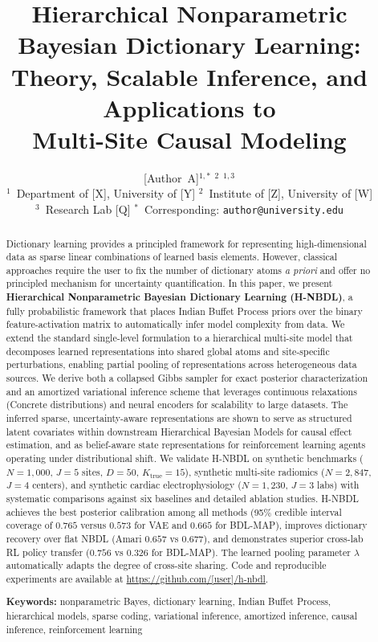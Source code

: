 \documentclass[11pt,a4paper]{article}
\title{\textbf{Hierarchical Nonparametric Bayesian Dictionary Learning:}\\[4pt]
Theory, Scalable Inference, and Applications to\\Multi-Site Causal Modeling}
\author{
  {[Author~A]}$^{1,*}$ \quad {[Author~B]}$^{2}$ \quad {[Author~C]}$^{1,3}$\\[6pt]
  \small $^1$~Department of [X], University of [Y] \quad
  $^2$~Institute of [Z], University of [W]\\
  \small $^3$~Research Lab [Q] \quad
  $^*$~Corresponding: \texttt{author@university.edu}
}
\date{}
\theoremstyle{definition}
\begin{document}
\maketitle

\begin{abstract}
Dictionary learning provides a principled framework for representing high-dimensional data as sparse linear combinations of learned basis elements. However, classical approaches require the user to fix the number of dictionary atoms \emph{a priori} and offer no principled mechanism for uncertainty quantification. In this paper, we present \textbf{Hierarchical Nonparametric Bayesian Dictionary Learning (H-NBDL)}, a fully probabilistic framework that places Indian Buffet Process priors over the binary feature-activation matrix to automatically infer model complexity from data. We extend the standard single-level formulation to a hierarchical multi-site model that decomposes learned representations into shared global atoms and site-specific perturbations, enabling partial pooling of representations across heterogeneous data sources. We derive both a collapsed Gibbs sampler for exact posterior characterization and an amortized variational inference scheme that leverages continuous relaxations (Concrete distributions) and neural encoders for scalability to large datasets. The inferred sparse, uncertainty-aware representations are shown to serve as structured latent covariates within downstream Hierarchical Bayesian Models for causal effect estimation, and as belief-aware state representations for reinforcement learning agents operating under distributional shift. We validate H-NBDL on synthetic benchmarks ($N{=}1{,}000$, $J{=}5$ sites, $D{=}50$, $K_{\mathrm{true}}{=}15$), synthetic multi-site radiomics ($N{=}2{,}847$, $J{=}4$ centers), and synthetic cardiac electrophysiology ($N{=}1{,}230$, $J{=}3$ labs) with systematic comparisons against six baselines and detailed ablation studies. H-NBDL achieves the best posterior calibration among all methods (95\% credible interval coverage of $0.765$ versus $0.573$ for VAE and $0.665$ for BDL-MAP), improves dictionary recovery over flat NBDL (Amari $0.657$ vs $0.677$), and demonstrates superior cross-lab RL policy transfer ($0.756$ vs $0.326$ for BDL-MAP). The learned pooling parameter $\lambda$ automatically adapts the degree of cross-site sharing. Code and reproducible experiments are available at \url{https://github.com/[user]/h-nbdl}.

\medskip\noindent
\textbf{Keywords:} nonparametric Bayes, dictionary learning, Indian Buffet Process, hierarchical models, sparse coding, variational inference, amortized inference, causal inference, reinforcement learning
\end{abstract}
\end{document}
